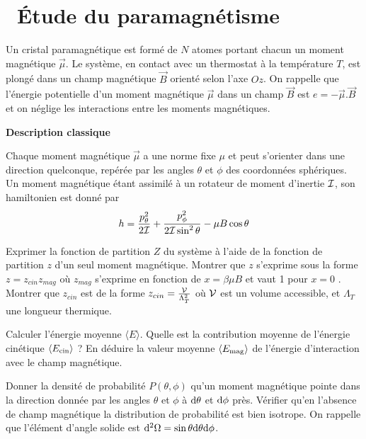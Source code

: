 \documentclass[utf8, 11pt]{feuille}
\begin{document}




\section{\medium~Étude du paramagnétisme}

Un cristal paramagnétique est formé de $N$ atomes portant chacun un moment magnétique $\overrightarrow{\mu}$. Le système, en contact avec un thermostat à la température $T$, est plongé dans un champ magnétique $\overrightarrow{B}$ orienté selon l'axe $Oz$.  On rappelle que l'énergie potentielle d'un moment magnétique $\overrightarrow{\mu}$ dans un champ $\overrightarrow{B}$ est $e=-\overrightarrow{\mu}.\overrightarrow{B}$ et on néglige les interactions entre les moments magnétiques.

\medskip

{\sffamily\bfseries{Description classique}}

Chaque moment magnétique $\overrightarrow{\mu}$ a une norme fixe $\mu$ et peut s'orienter dans une direction quelconque, repérée par les angles $\theta$ et $\phi$ des coordonnées sphériques. Un moment magnétique étant assimilé à un rotateur de moment d'inertie $\cal I$, son hamiltonien est donné par
$$
h=\frac{p_{\theta}^2}{2 {\cal I}} + \frac{p_{\phi}^2}{2 {\cal I}\sin^{2} \theta} -\mu B \cos \theta
$$

\question
Exprimer la fonction de partition $Z$ du système à l'aide de la fonction de partition $z$ d'un seul moment magnétique. Montrer que $z$ s'exprime sous la forme $z=z_{cin}z_{mag}$ où $z_{mag}$ s'exprime en fonction de $x=\beta \mu B$ et vaut 1 pour $x=0$ . Montrer que $z_{cin}$ est de la forme $z_{cin}=\frac{\cal V}{\Lambda_T^2}$ où $\cal V$ est un \og volume accessible\fg, et $\Lambda_T$ une longueur  thermique.

\question
Calculer l'énergie moyenne $\langle E \rangle$. Quelle est la contribution moyenne de l'énergie cinétique $\langle E_{\rm cin} \rangle$ ? En déduire la valeur moyenne $\langle E_{\rm mag}\rangle $ de l'énergie d'interaction avec le champ magnétique.

\question
Donner la densité de probabilité $P(\theta, \phi)$ qu'un moment magnétique pointe dans la direction donnée par les angles $\theta$ et $\phi$ à ${\rm d}\theta$ et ${\rm d}\phi$ près. Vérifier qu'en l'absence de champ magnétique la distribution de probabilité est bien isotrope. On rappelle que l'élément d'angle solide est ${\rm d}^2 \Omega= \sin \theta {\rm d} \theta {\rm d} \phi$.
\end{document}
